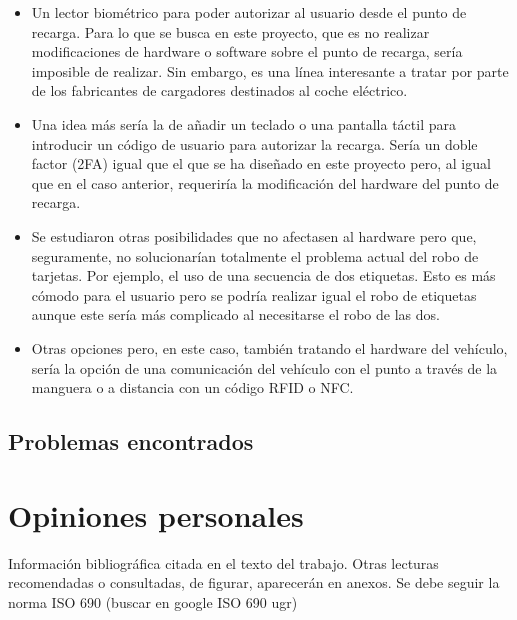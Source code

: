 \documentclass[12pt,a4paper,onecolumn,oneside]{report}
\begin{document}
\begin{itemize}
\item Un lector biométrico para poder autorizar al usuario desde el punto de recarga. Para lo que se busca en este proyecto, que es no realizar modificaciones de hardware o software sobre el punto de recarga, sería imposible de realizar. Sin embargo, es una línea interesante a tratar por parte de los fabricantes de cargadores destinados al coche eléctrico.

\item Una idea más sería la de añadir un teclado o una pantalla táctil para introducir un código de usuario para autorizar la recarga. Sería un doble factor (2FA) igual que el que se ha diseñado en este proyecto pero, al igual que en el caso anterior, requeriría la modificación del hardware del punto de recarga.

\item Se estudiaron otras posibilidades que no afectasen al hardware pero que, seguramente, no solucionarían totalmente el problema actual del robo de tarjetas. Por ejemplo, el uso de una secuencia de dos etiquetas. Esto es más cómodo para el usuario pero se podría realizar igual el robo de etiquetas aunque este sería más complicado al necesitarse el robo de las dos.

\item Otras opciones pero, en este caso, también tratando el hardware del vehículo, sería la opción de una comunicación del vehículo con el punto a través de la manguera o a distancia con un código RFID o NFC.

\end{itemize}




\subsection*{Problemas encontrados}



\section*{Opiniones personales}




\renewcommand\bibname{Lista de referencias}

Información bibliográfica citada en el texto del trabajo. Otras lecturas recomendadas o consultadas, de figurar, aparecerán en anexos.
Se debe seguir la norma ISO 690 (buscar en google ISO 690 ugr)
\end{document}
